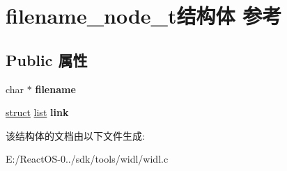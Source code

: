 \hypertarget{structfilename__node__t}{}\section{filename\+\_\+node\+\_\+t结构体 参考}
\label{structfilename__node__t}
\subsection*{Public 属性}
\begin{DoxyCompactItemize}
\item 
\mbox{\label{structfilename__node__t_a121f60d7080ce176a33c9a5a10cd0819}} 
char $\ast$ {\bfseries filename}
\item 
\mbox{\label{structfilename__node__t_a274cf396f131f9172a13a99a2a802133}} 
\hyperlink{interfacestruct}{struct} \hyperlink{classlist}{list} {\bfseries link}
\end{DoxyCompactItemize}


该结构体的文档由以下文件生成\+:\begin{DoxyCompactItemize}
\item 
E\+:/\+React\+O\+S-\/0../sdk/tools/widl/widl.\+c\end{DoxyCompactItemize}
